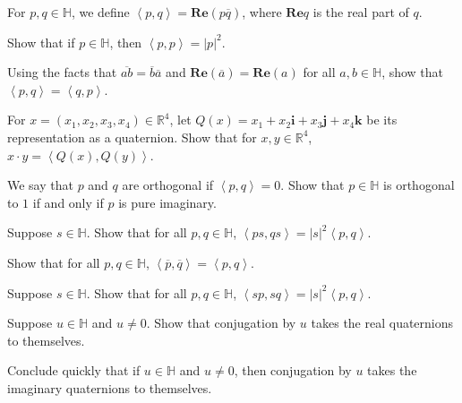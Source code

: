 \documentclass[minion]{homework}
\newcommand{\Reals}{\mathbb{R}}
\newcommand{\Quats}{\mathbb{H}}
\def\ip<#1,#2>{\left<#1,#2\right>}
\newcommand{\vi}{\mathbf{i}}
\newcommand{\vj}{\mathbf{j}}
\newcommand{\vk}{\mathbf{k}}
\renewcommand{\Re}{\mathbf{Re}}
\begin{document}
\begin{problems}
\problem For $p,q \in \Quats$, we define $\ip<p,q>=\Re(p\overline q)$,
where $\Re q$ is the real part of $q$.
\begin{subproblems}
\item Show that if $p\in \Quats$, then $\ip<p,p>=|p|^2$.
\item Using the facts that $\overline{ab}=\overline b \overline a$ and $\Re(\overline a) = \Re(a)$
for all $a,b\in \Quats$, show that $\ip<p,q>=\ip<q,p>$.
\item For $x=(x_1,x_2,x_3,x_4)\in \Reals^4$, let $Q(x)=x_1 + x_2\vi+ x_3\vj+x_4\vk$
be its representation as a quaternion.
Show that for $x,y\in \Reals^4$, $x\cdot y = \ip<Q(x),Q(y)>$.
\item We say that $p$ and $q$ are orthogonal if $\ip<p,q>=0$. 
Show that $p\in\Quats$ is orthogonal to $1$ if and only if $p$ is pure imaginary.
\item Suppose $s\in \Quats$.  Show that for all $p,q\in\Quats$,
$\ip<ps,qs> = |s|^2\ip<p,q>$.  
\item Show that for all $p,q\in\Quats$, $\ip<\overline p, \overline q>=\ip<p,q>$.
\item Suppose $s\in \Quats$.  Show that for all $p,q\in\Quats$,
$\ip<sp,sq> = |s|^2\ip<p,q>$.  
\item Suppose $u\in\Quats$ and $u\neq 0$.  Show that conjugation by $u$ takes the real quaternions to themselves.
\item Conclude quickly that if $u\in\Quats$ and $u\neq 0$, then
conjugation by $u$ takes the imaginary quaternions to themselves.
\end{subproblems}

\end{problems}
\end{document}
